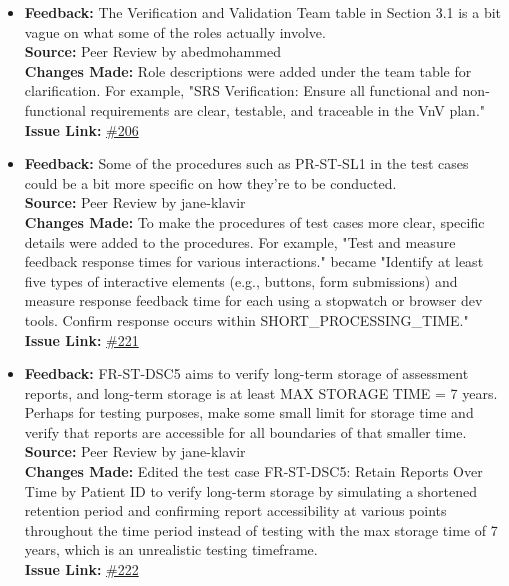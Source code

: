 \documentclass{article}
\begin{document}
\begin{itemize}
    \item 
      \textbf{Feedback:} The Verification and Validation Team table in Section 3.1 is a bit vague on what some of the roles actually involve. \\
      \textbf{Source:} Peer Review by abedmohammed \\
      \textbf{Changes Made:} Role descriptions were added under the team table for clarification. For example, "SRS Verification: Ensure all functional and non-functional requirements are clear, testable, and traceable in the VnV plan."\\
      \textbf{Issue Link:} \href{https://github.com/parishanizam/TeleHealth/issues/206}{\#206}

    \item 
      \textbf{Feedback:} Some of the procedures such as PR-ST-SL1 in the test cases could be a bit more specific on how they're to be conducted. \\
      \textbf{Source:} Peer Review by jane-klavir \\
      \textbf{Changes Made:} To make the procedures of test cases more clear, specific details were added to the procedures. For example, "Test and measure feedback response times for various interactions." became "Identify at least five types of interactive elements (e.g., buttons, form submissions) and measure response feedback time for each using a stopwatch or browser dev tools. Confirm response occurs within SHORT\_PROCESSING\_TIME."\\
      \textbf{Issue Link:} \href{https://github.com/parishanizam/TeleHealth/issues/221}{\#221}

    \item 
      \textbf{Feedback:} FR-ST-DSC5 aims to verify long-term storage of assessment reports, and long-term storage is at least MAX STORAGE TIME = 7 years. Perhaps for testing purposes, make some small limit for storage time and verify that reports are accessible for all boundaries of that smaller time. \\
      \textbf{Source:} Peer Review by jane-klavir \\
      \textbf{Changes Made:} Edited the test case FR-ST-DSC5: Retain Reports Over Time by Patient ID to verify long-term storage by simulating a shortened retention period and confirming report accessibility at various points throughout the time period instead of testing with the max storage time of 7 years, which is an unrealistic testing timeframe.\\
      \textbf{Issue Link:} \href{https://github.com/parishanizam/TeleHealth/issues/222}{\#222}


\end{itemize}
\end{document}

